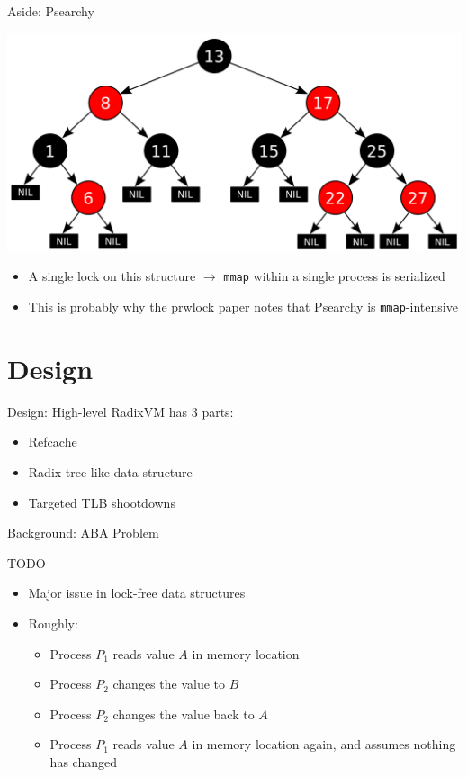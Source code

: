 \documentclass[aspectratio=169]{beamer}
\newcommand{\bi}{\begin{itemize}}
\newcommand{\ei}{\end{itemize}}
\begin{document}
\begin{frame}{Aside: Psearchy}
  \begin{center}
    \includegraphics[scale=0.2]{./figures/Red-black_tree.png}
  \end{center}
    \bi
  \item {\color{red}A single lock on this structure} $\rightarrow$ \texttt{mmap} within a single process is serialized
    \item This is probably why the prwlock paper notes that Psearchy is \texttt{mmap}-intensive
    \ei
\end{frame}

\section{Design}

\begin{frame}{Design: High-level}
  RadixVM has 3 parts:
  \begin{center}
    \bi
  \item Refcache
  \item Radix-tree-like data structure
  \item Targeted TLB shootdowns
    \ei
  \end{center}
\end{frame}

\begin{frame}{Background: ABA Problem}
  \begin{center}
    TODO
    \bi
  \item Major issue in lock-free data structures
  \item Roughly:
    \bi
  \item Process $P_1$ reads value $A$ in memory location
  \item Process $P_2$ changes the value to $B$
  \item Process $P_2$ changes the value back to $A$
  \item Process $P_1$ reads value $A$ in memory location again, and assumes nothing has changed
    \ei
    \ei
  \end{center}
\end{frame}
\end{document}
